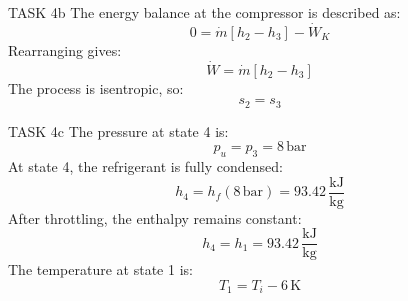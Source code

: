 TASK 4b  
The energy balance at the compressor is described as:  
\[
0 = \dot{m} \left[ h_2 - h_3 \right] - \dot{W}_K
\]  
Rearranging gives:  
\[
\dot{W} = \dot{m} \left[ h_2 - h_3 \right]
\]  
The process is isentropic, so:  
\[
s_2 = s_3
\]  

TASK 4c  
The pressure at state 4 is:  
\[
p_u = p_3 = 8 \, \text{bar}
\]  
At state 4, the refrigerant is fully condensed:  
\[
h_4 = h_f(8 \, \text{bar}) = 93.42 \, \frac{\text{kJ}}{\text{kg}}
\]  
After throttling, the enthalpy remains constant:  
\[
h_4 = h_1 = 93.42 \, \frac{\text{kJ}}{\text{kg}}
\]  
The temperature at state 1 is:  
\[
T_1 = T_i - 6 \, \text{K}
\]